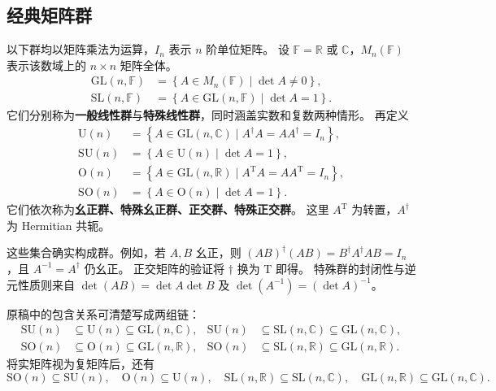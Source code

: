 \subsection{经典矩阵群}
以下群均以矩阵乘法为运算，$I_n$ 表示 $n$ 阶单位矩阵。
设 $\mathbb{F}=\mathbb{R}$ 或 $\mathbb{C}$，$M_n\left(\mathbb{F}\right)$ 表示该数域上的 $n\times n$ 矩阵全体。
\begin{align}
\mathrm{GL}\left(n,\mathbb{F}\right)&=\left\{A\in M_n\left(\mathbb{F}\right)\mid\det A\ne0\right\},\\
\mathrm{SL}\left(n,\mathbb{F}\right)&=\left\{A\in\mathrm{GL}\left(n,\mathbb{F}\right)\mid\det A=1\right\}.
\end{align}
它们分别称为\textbf{一般线性群}与\textbf{特殊线性群}，同时涵盖实数和复数两种情形。
再定义
\begin{align}
\mathrm{U}\left(n\right)&=\left\{A\in\mathrm{GL}\left(n,\mathbb{C}\right)\mid A^\dagger A=AA^\dagger=I_n\right\},\\
\mathrm{SU}\left(n\right)&=\left\{A\in\mathrm{U}\left(n\right)\mid\det A=1\right\},\\
\mathrm{O}\left(n\right)&=\left\{A\in\mathrm{GL}\left(n,\mathbb{R}\right)\mid A^{\mathrm{T}}A=AA^{\mathrm{T}}=I_n\right\},\\
\mathrm{SO}\left(n\right)&=\left\{A\in\mathrm{O}\left(n\right)\mid\det A=1\right\}.
\end{align}
它们依次称为\textbf{幺正群、特殊幺正群、正交群、特殊正交群}。
这里 $A^{\mathrm{T}}$ 为转置，$A^\dagger$ 为 Hermitian 共轭。

这些集合确实构成群。例如，若 $A,B$ 幺正，则
$\left(AB\right)^\dagger\left(AB\right)=B^\dagger A^\dagger AB=I_n$，且 $A^{-1}=A^\dagger$ 仍幺正。
正交矩阵的验证将 $\dagger$ 换为 $\mathrm{T}$ 即得。
特殊群的封闭性与逆元性质则来自
$\det\left(AB\right)=\det A\det B$ 及 $\det\left(A^{-1}\right)=\left(\det A\right)^{-1}$。

原稿中的包含关系可清楚写成两组链：
\begin{align}
\mathrm{SU}\left(n\right)&\subseteq\mathrm{U}\left(n\right)\subseteq\mathrm{GL}\left(n,\mathbb{C}\right),&
\mathrm{SU}\left(n\right)&\subseteq\mathrm{SL}\left(n,\mathbb{C}\right)\subseteq\mathrm{GL}\left(n,\mathbb{C}\right),\\
\mathrm{SO}\left(n\right)&\subseteq\mathrm{O}\left(n\right)\subseteq\mathrm{GL}\left(n,\mathbb{R}\right),&
\mathrm{SO}\left(n\right)&\subseteq\mathrm{SL}\left(n,\mathbb{R}\right)\subseteq\mathrm{GL}\left(n,\mathbb{R}\right).
\end{align}
将实矩阵视为复矩阵后，还有
\begin{equation}
\mathrm{SO}\left(n\right)\subseteq\mathrm{SU}\left(n\right),\quad \mathrm{O}\left(n\right)\subseteq\mathrm{U}\left(n\right),\quad
\mathrm{SL}\left(n,\mathbb{R}\right)\subseteq\mathrm{SL}\left(n,\mathbb{C}\right),\quad \mathrm{GL}\left(n,\mathbb{R}\right)\subseteq\mathrm{GL}\left(n,\mathbb{C}\right).
\end{equation}

